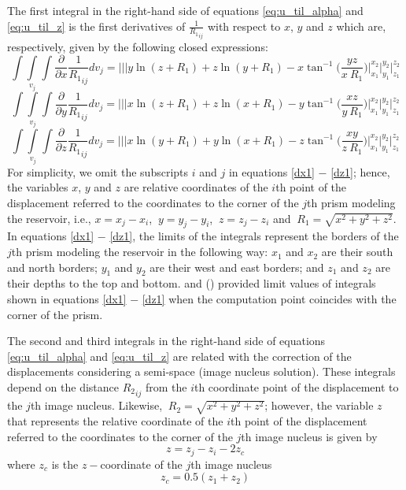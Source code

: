 \documentclass[journal abbreviation, manuscript]{copernicus}
\begin{document}
The first integral in the right-hand side of equations  \ref{eq:u_til_alpha} and \ref{eq:u_til_z}  is the first derivatives of ${\frac{1}{{R_1}_{ij}}}$ with respect to $x$, $y$ and $z$ which are, respectively, given by the following closed expressions: 
\begin{equation}
\int\int\limits_{v_j}\int  \frac{\partial }{\partial x} {\frac{1}{{R_1}_{ij}}} dv_j =
\Bigg|\Bigg|\Bigg| 
y \ln(z + {R_1}) + z \ln(y + {R_1}) -  x  \tan^{-1} \Bigg( \frac{yz}{x \:{R_1}} \Bigg) 
\Bigg|_{x_1}^{x_2} \Bigg|_{y_1}^{y_2} \Bigg|_{z_1}^{z_2}
\label{dx1}
\end{equation}
\begin{equation}
\int\int\limits_{v_j}\int  \frac{\partial }{\partial y} {\frac{1}{{R_1}_{ij}}} dv_j =
\Bigg|\Bigg|\Bigg|
x \ln(z + {R_1}) + z \ln(x + {R_1}) -  y  \tan^{-1} \Bigg( \frac{xz}{y \:{R_1}} 
\Bigg)
\Bigg|_{x_1}^{x_2} \Bigg|_{y_1}^{y_2} \Bigg|_{z_1}^{z_2}
\label{dy1}
\end{equation}
\begin{equation}
\int\int\limits_{v_j}\int  \frac{\partial }{\partial z} {\frac{1}{{R_1}_{ij}}} dv_j =
\Bigg|\Bigg|\Bigg|
x \ln(y + {R_1}) + y \ln(x + {R_1}) -  z  \tan^{-1} \Bigg( \frac{xy}{z \:{R_1}} \Bigg) 
\Bigg|_{x_1}^{x_2} \Bigg|_{y_1}^{y_2} \Bigg|_{z_1}^{z_2}
\label{dz1}
\end{equation}
For simplicity,  we omit the subscripts $i$ and $j$ in equations \ref{dx1} $-$ \ref{dz1}; hence, the variables $x$, $y$ and $z$  are relative coordinates of the $i$th point of the displacement referred to the coordinates to the corner of the $j$th prism modeling the reservoir, i.e.,  $x = x_j - x_i $, $\: y = y_j - y_i $, $\: z = z_j - z_i $ and 
$\: {R_1} = \sqrt{x^{2} + y^{2} + z^{2}}$.
In equations \ref{dx1} $-$ \ref{dz1}, the limits of the integrals represent the borders of the $j$th prism modeling the reservoir in the following way: $x_1$ and $x_2$ are their south and north borders; $y_1$ and  $y_2$ are their  west and east borders;  and 
$z_1$ and $z_2$ are their depths to the top and bottom.
\cite{Nagyetal2000} and (\citeyear{Nagyetal2002}) provided limit values of integrals shown in equations \ref{dx1} $-$ \ref{dz1} when the computation point coincides with the corner of the prism.

The second and third integrals in the right-hand side of equations  \ref{eq:u_til_alpha}  and \ref{eq:u_til_z} are related with the correction of the displacements considering  a semi-space (image nucleus solution).
These integrals depend on the distance ${R_2}_{ij}$ from the $i$th coordinate point of the displacement to the $j$th image nucleus.
Likewise, $\: {R_2} = \sqrt{x^{2} + y^{2} + z^{2}}$; however, the variable $z$  that represents the relative coordinate of the $i$th point of the displacement referred to the coordinates to the corner of the $j$th image nucleus is given by
\begin{equation}
z = z_j - z_i - 2 z_c
\label{z_image}
\end{equation}
where  $z_c$ is the $z-$coordinate of the $j$th image nucleus
\begin{equation}
z_c = 0.5 (z_1 + z_2)
\label{z_c}
\end{equation}
\end{document}
